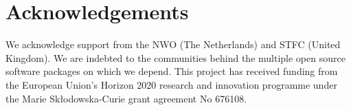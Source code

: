 \section*{Acknowledgements}

\noindent
We acknowledge support from
the NWO (The Netherlands) and STFC (United Kingdom).
We are indebted to the communities behind the multiple open
source software packages on which we depend.
This project has received funding from the European Union’s Horizon
2020 research and innovation programme under the Marie Skłodowska-Curie
grant agreement No 676108.
